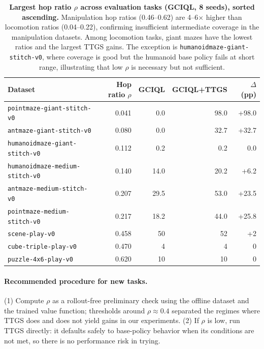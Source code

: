 \documentclass{article} %
\begin{document}
\begin{table}[H]
  \centering
  \small
  \caption{\textbf{Largest hop ratio $\rho$ across evaluation tasks (GCIQL, 8 seeds), sorted ascending.} Manipulation hop ratios (0.46--0.62) are 4--6$\times$ higher than locomotion ratios (0.04--0.22), confirming insufficient intermediate coverage in the manipulation datasets. Among locomotion tasks, giant mazes have the lowest ratios and the largest TTGS gains. The exception is \texttt{humanoidmaze-giant-stitch-v0}, where coverage is good but the humanoid base policy fails at short range, illustrating that low $\rho$ is necessary but not sufficient.}
  \label{tab:hopratio}
  \begin{tabular*}{0.85\linewidth}{@{\extracolsep{\fill}}lrrrr}
    \toprule
    Dataset & Hop ratio $\rho$ & GCIQL & GCIQL+TTGS & $\Delta$ (pp) \\
    \midrule
    \texttt{pointmaze-giant-stitch-v0}     & 0.041 & 0.0  & 98.0 & +98.0 \\
    \texttt{antmaze-giant-stitch-v0}       & 0.080 & 0.0  & 32.7 & +32.7 \\
    \texttt{humanoidmaze-giant-stitch-v0}  & 0.112 & 0.2  & 0.2  & 0.0   \\
    \texttt{humanoidmaze-medium-stitch-v0} & 0.140 & 14.0 & 20.2 & +6.2  \\
    \texttt{antmaze-medium-stitch-v0}      & 0.207 & 29.5 & 53.0 & +23.5 \\
    \texttt{pointmaze-medium-stitch-v0}    & 0.217 & 18.2 & 44.0 & +25.8 \\
    \texttt{scene-play-v0}                 & 0.458 & 50   & 52   & +2    \\
    \texttt{cube-triple-play-v0}           & 0.470 & 4    & 4    & 0     \\
    \texttt{puzzle-4x6-play-v0}            & 0.620 & 10   & 10   & 0     \\
    \bottomrule
  \end{tabular*}
\end{table}

\paragraph{Recommended procedure for new tasks.} (1) Compute $\rho$ as a rollout-free preliminary check using the offline dataset and the trained value function; thresholds around $\rho \approx 0.4$ separated the regimes where TTGS does and does not yield gains in our experiments. (2) If $\rho$ is low, run TTGS directly: it defaults safely to base-policy behavior when its conditions are not met, so there is no performance risk in trying.
\end{document}
